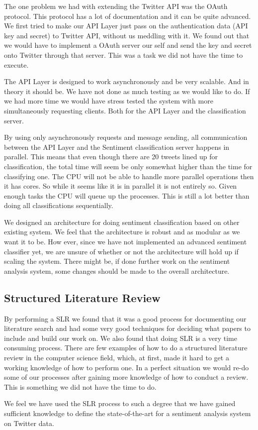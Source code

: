 The one problem we had with extending the Twitter API was the OAuth protocol. This protocol has a lot of documentation and it can be quite advanced. We first tried to make our API Layer just pass on the authentication data (API key and secret) to Twitter API, without us meddling with it. We found out that we would have to implement a OAuth server our self and send the key and secret onto Twitter through that server. This was a task we did not have the time to execute. 

The API Layer is designed to work asynchronously and be very scalable. And in theory it should be. We have not done as much testing as we would like to do. If we had more time we would have stress tested the system with more simultaneously requesting clients. Both for the API Layer and the classification server. 

By using only asynchronously requests and message sending, all communication between the API Layer and the Sentiment classification server happens in parallel. This means that even though there are 20 tweets lined up for classification, the total time will seem be only somewhat higher than the time for classifying one. The CPU will not be able to handle more parallel operations then it has cores. So while it seems like it is in parallel it is not entirely so. Given enough tasks the CPU will queue up the processes. This is still a lot better than doing all classifications sequentially. 

We designed an architecture for doing sentiment classification based on other existing system. We feel that the architecture is robust and as modular as we want it to be. How ever, since we have not implemented an advanced sentiment classifier yet, we are unsure of whether or not the architecture will hold up if scaling the system. There might be, if done further work on the sentiment analysis system, some changes should be made to the overall architecture. 


\subsection{Structured Literature Review}

By performing a SLR we found that it was a good process for documenting our literature search and had some very good techniques for deciding what papers to include and build our work on. We also found that doing SLR is a very time consuming process. There are few examples of how to do a structured literature review in the computer science field, which, at first, made it hard to get a working knowledge of how to perform one. In a perfect situation we would re-do some of our processes after gaining more knowledge of how to conduct a review. This is something we did not have the time to do. 

We feel we have used the SLR process to such a degree that we have gained sufficient knowledge to define the state-of-the-art for a sentiment analysis system on Twitter data. 